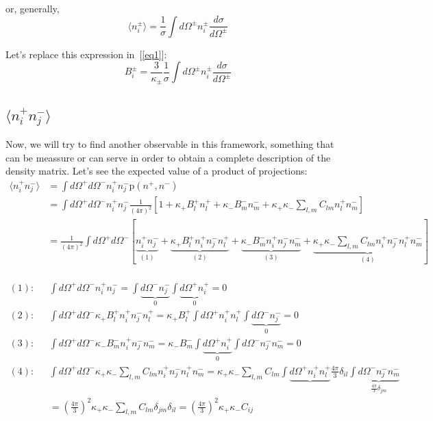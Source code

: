 \documentclass[onecolumn, amsmath, amssymb, aps, prd]{revtex4-2}
\begin{document}
			or, generally,
			\begin{equation}
				\langle n_i^{\pm} \rangle = \frac{1}{\sigma} \int d\Omega^{\pm} n_i^{\pm} \frac{d\sigma}{d\Omega^{\pm}}
			\end{equation}


			Let's replace this expression in~[\ref{eq1}]:
			\begin{equation}
				B_i^{\pm} = \frac{3}{\kappa_{\pm}} \frac{1}{\sigma} \int d\Omega^{\pm} n_i^{\pm} \frac{d\sigma}{d\Omega^{\pm}}
			\end{equation}

		\subsection{$\langle n_i^+ n_j^- \rangle$}
			Now, we will try to find another observable in this framework, something that can be meassure or can serve in order to obtain a complete description of the density matrix. Let's see the expected value of a product of projections:
			\begin{equation}
				\begin{split}
					\langle n_i^+ n_j^- \rangle & = \int d\Omega^+ d\Omega^- n_i^+ n_j^- \text{p}(n^+, n^-) \\
					& = \int d\Omega^+ d\Omega^- n_i^+ n_j^- \frac{1}{(4\pi)^2} \left[ 1 + \kappa_+ B_l^+ n_l^+ + \kappa_- B_m^- n_m^- + \kappa_+ \kappa_- \sum_{l,m} C_{lm} n_l^+ n_m^- \right] \\
					& = \frac{1}{(4\pi)^2} \int d\Omega^+ d\Omega^- \left[ \underbrace{n_i^+ n_j^-}_{(1)} + \underbrace{\kappa_+ B_l^+ n_i^+ n_j^- n_l^+}_{(2)} + \underbrace{\kappa_- B_m^- n_i^+ n_j^- n_m^-}_{(3)} + \underbrace{\kappa_+ \kappa_- \sum_{l,m} C_{lm} n_i^+ n_j^- n_l^+ n_m^-}_{(4)} \right] \\
				\end{split}
			\end{equation}

			\begin{equation}
				\begin{split}
					(1): \ \ \ & \int d\Omega^+ d\Omega^- n_i^+ n_j^- = \int \underbrace{d\Omega^- n_j^-}_{0} \int \underbrace{d\Omega^+ n_i^+}_{0} = 0 \\
					(2): \ \ \ & \int d\Omega^+ d\Omega^- \kappa_+ B_l^+ n_i^+ n_j^- n_l^+ = \kappa_+ B_l^+ \int d\Omega^+ n_i^+ n_l^+ \int \underbrace{d\Omega^-  n_j^-}_{0} = 0 \\
					(3): \ \ \ & \int d\Omega^+ d\Omega^- \kappa_- B_m^- n_i^+ n_j^- n_m^- = \kappa_- B_m^- \int \underbrace{d\Omega^+ n_i^+}_{0} \int d\Omega^- n_j^- n_m^- = 0 \\
					(4): \ \ \ & \int d\Omega^+ d\Omega^- \kappa_+ \kappa_- \sum_{l,m} C_{lm} n_i^+ n_j^- n_l^+ n_m^- = \kappa_+ \kappa_- \sum_{l,m} C_{lm} \int \underbrace{d\Omega^+ n_i^+ n_l^+}{\frac{4\pi}{3} \delta_{il}} \int \underbrace{d\Omega^- n_j^- n_m^-}_{\frac{4\pi}{3} \delta_{jm}} \\
					& = \left( \frac{4\pi}{3} \right)^2 \kappa_+ \kappa_- \sum_{l,m} C_{lm} \delta_{jm} \delta_{il} = \left( \frac{4\pi}{3} \right)^2 \kappa_+ \kappa_- C_{ij}
				\end{split}
			\end{equation}
\end{document}
